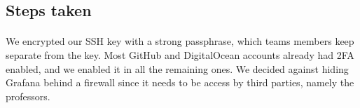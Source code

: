 \subsection{Steps taken}
\paragraph{} 
We encrypted our SSH key with a strong passphrase, which teams members keep separate from the key. Most GitHub and DigitalOcean accounts already had 2FA enabled, and we enabled it in all the remaining ones. We decided against hiding Grafana behind a firewall since it needs to be access by third parties, namely the professors.
